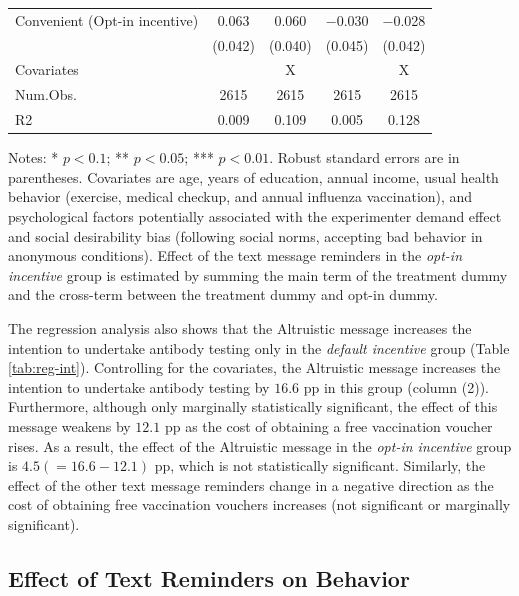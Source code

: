 \documentclass[
  11pt,
  a4paper
]{article}
\begin{document}
\begin{table}
\begin{threeparttable}
\begin{tabular}[t]{lcccc}
\hspace{1em}Convenient (Opt-in incentive) & \num{0.063} & \num{0.060} & \num{-0.030} & \num{-0.028}\\
\hspace{1em} & (\num{0.042}) & (\num{0.040}) & (\num{0.045}) & (\num{0.042})\\
\midrule
Covariates &  & X &  & X\\
Num.Obs. & \num{2615} & \num{2615} & \num{2615} & \num{2615}\\
R2 & \num{0.009} & \num{0.109} & \num{0.005} & \num{0.128}\\
\bottomrule
\end{tabular}
\begin{tablenotes}
\item Notes: * $p < 0.1$; ** $p < 0.05$; *** $p < 0.01$. Robust standard errors are in parentheses. Covariates are age, years of education, annual income, usual health behavior (exercise, medical checkup, and annual influenza vaccination), and psychological factors potentially associated with the experimenter demand effect and social desirability bias (following social norms, accepting bad behavior in anonymous conditions). Effect of the text message reminders in the \emph{opt-in incentive} group is estimated by summing the main term of the treatment dummy and the cross-term between the treatment dummy and opt-in dummy.
\end{tablenotes}
\end{threeparttable}
\end{table}

The regression analysis also shows that the Altruistic message increases the intention to undertake antibody testing only in the \emph{default incentive} group (Table \ref{tab:reg-int}). Controlling for the covariates, the Altruistic message increases the intention to undertake antibody testing by \(16.6\) pp in this group (column (2)). Furthermore, although only marginally statistically significant, the effect of this message weakens by \(12.1\) pp as the cost of obtaining a free vaccination voucher rises. As a result, the effect of the Altruistic message in the \emph{opt-in incentive} group is \(4.5 (=16.6-12.1)\) pp, which is not statistically significant. Similarly, the effect of the other text message reminders change in a negative direction as the cost of obtaining free vaccination vouchers increases (not significant or marginally significant).

\hypertarget{behavior}{%
\subsection{Effect of Text Reminders on Behavior}\label{behavior}}
\end{document}
